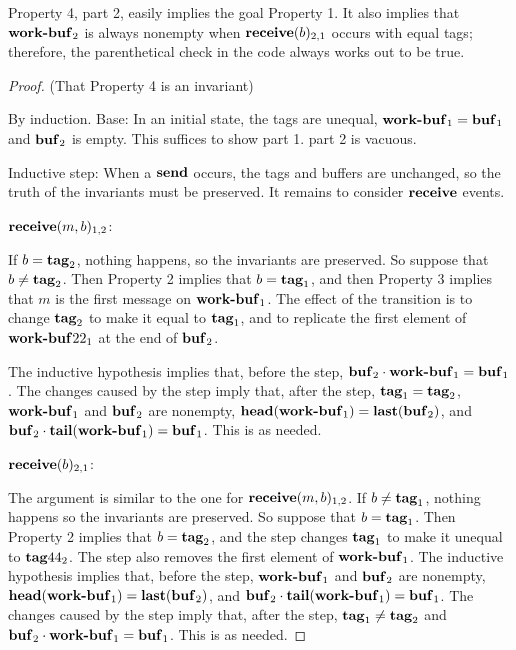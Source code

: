 Property 4, part 2, easily implies the goal Property 1.
It also implies that $\text{\textbf{work-buf}}_2$ is always nonempty when 
$\text{\textbf{receive}}(b)_{2,1}$ occurs with equal tags; therefore, the
parenthetical check in the code always works out to be true.

\begin{proof}
(That Property 4 is an invariant)

By induction. 
Base: In an initial state, the tags are unequal, 
$\text{\textbf{work-buf}}_1 = \text{\textbf{buf}}_1$ and $\text{\textbf{buf}}_2$ is empty.  This
suffices to show part 1.  part 2 is vacuous.

Inductive step:
When a $\text{\textbf{send}}$ occurs, the tags and buffers are unchanged, so the
truth of the invariants must be preserved. 
It remains to consider $\text{\textbf{receive}}$ events.

$\text{\textbf{receive}}(m,b)_{1,2}$:

If $b = \text{\textbf{tag}}_2$, nothing happens, so the invariants are
preserved.  So suppose that $b \neq \text{\textbf{tag}}_2$.  Then
Property 2 implies that $b = \text{\textbf{tag}}_1$, and then Property
3 implies that $m$ is the first message on
$\text{\textbf{work-buf}}_1$.  The effect of the transition is to
change $\text{\textbf{tag}}_2$ to make it equal to
$\text{\textbf{tag}}_1$, and to replicate the first element of
$\text{\textbf{work-buf}}22_1$ at the end of $\text{\textbf{buf}}_2$.

The inductive hypothesis implies that, before the step,
$\text{\textbf{buf}}_2 \cdot \text{\textbf{work-buf}}_1 =
\text{\textbf{buf}}_1$.  The changes caused by the step imply that,
after the step, $\text{\textbf{tag}}_1 = \text{\textbf{tag}}_2$,
$\text{\textbf{work-buf}}_1$ and $\text{\textbf{buf}}_2$ are nonempty,
$\text{\textbf{head}}(\text{\textbf{work-buf}}_1) =
\text{\textbf{last}}(\text{\textbf{buf}}_2)$, and
$\text{\textbf{buf}}_2 \cdot
\text{\textbf{tail}}(\text{\textbf{work-buf}}_1) =
\text{\textbf{buf}}_1$.  This is as needed.

$\text{\textbf{receive}}(b)_{2,1}$:

The argument is similar to the one for
$\text{\textbf{receive}}(m,b)_{1,2}$.  If $b \neq
\text{\textbf{tag}}_1$, nothing happens so the invariants are
preserved.  So suppose that $b = \text{\textbf{tag}}_1$.  Then
Property 2 implies that $b = \text{\textbf{tag}}_2$, and the step
changes $\text{\textbf{tag}}_1$ to make it unequal to
$\text{\textbf{tag}}44_2$.  The step also removes the first element of
$\text{\textbf{work-buf}}_1$.  The inductive hypothesis implies that,
before the step, $\text{\textbf{work-buf}}_1$ and
$\text{\textbf{buf}}_2$ are nonempty,
$\text{\textbf{head}}(\text{\textbf{work-buf}}_1) =
\text{\textbf{last}}(\text{\textbf{buf}}_2)$, and
$\text{\textbf{buf}}_2 \cdot
\text{\textbf{tail}}(\text{\textbf{work-buf}}_1) =
\text{\textbf{buf}}_1$.  The changes caused by the step imply that,
after the step, $\text{\textbf{tag}}_1 \neq \text{\textbf{tag}}_2$ and
$\text{\textbf{buf}}_2 \cdot \text{\textbf{work-buf}}_1 =
\text{\textbf{buf}}_1$.  This is as needed.
\end{proof}


\endinput
